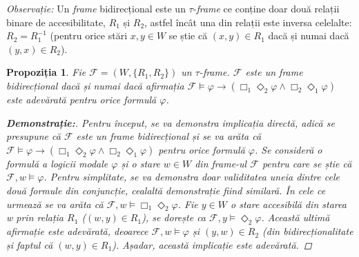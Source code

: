 \documentclass[12pt, openany]{book}
\newtheorem{sentence}[definition]{Propoziția} %
\begin{document}
            \par{}
                \noindent \textit{Observație:} Un \textit{frame} bidirecțional este un $\tau$-\textit{frame} ce conține 
                doar două relații binare de accesibilitate, $R_1$ și $R_2$, astfel încât una din relații este inversa 
                celelalte: $R_2=R_1^{-1}$ (pentru orice stări $x,y \in W$ se știe că $(x,y) \in R_1$ dacă și numai dacă 
                $(y,x) \in R_2$).
            
            \begin{sentence}
                Fie $\mathcal{F}=(W,\{R_1,R_2\})$ un $\tau$-\textit{frame}. $\mathcal{F}$ este un \textit{frame} 
                bidirecțional dacă și numai dacă afirmația $\mathcal{F} \vDash \varphi \rightarrow (\Box_1 \Diamond_2 
                \varphi \wedge \Box_2 \Diamond_1 \varphi)$ este adevărată pentru orice formulă $\varphi$.

                \begin{proof}[\textbf{Demonstrație:}]
                    Pentru început, se va demonstra implicația directă, adică se presupune că $\mathcal{F}$ este un 
                    \textit{frame} bidirecțional și se va arăta că $\mathcal{F} \vDash \varphi \rightarrow (\Box_1 
                    \Diamond_2 \varphi \wedge \Box_2 \Diamond_1 \varphi)$ pentru orice formulă $\varphi$. Se consideră o
                    formulă a logicii modale $\varphi$ și o stare $w \in W$ din \textit{frame}-ul $\mathcal{F}$ pentru 
                    care se știe că $\mathcal{F},w \vDash \varphi$. Pentru simplitate, se va demonstra doar validitatea 
                    uneia dintre cele două formule din conjuncție, cealaltă demonstrație fiind similară. În cele ce 
                    urmează se va arăta că $\mathcal{F},w \vDash \Box_1 \Diamond_2 \varphi$. Fie $y \in W$ o stare 
                    accesibilă din starea w prin relația $R_1$ ($(w,y) \in R_1$), se dorește ca $\mathcal{F},y \vDash 
                    \Diamond_2 \varphi$. Această ultimă afirmație este adevărată, deoarece $\mathcal{F},w \vDash 
                    \varphi$ și $(y,w) \in R_2$ (din bidirecționalitate și faptul că $(w,y) \in R_1$). Așadar, această 
                    implicație este adevărată.


\end{proof}
\end{sentence}
\end{document}
